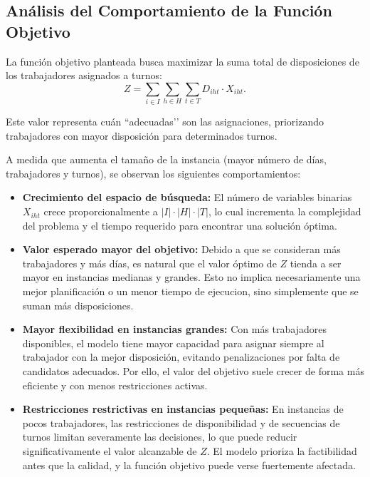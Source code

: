 \documentclass{article}
\begin{document}
\subsection*{Análisis del Comportamiento de la Función Objetivo}

La función objetivo planteada busca maximizar la suma total de disposiciones de los trabajadores asignados a turnos:
\[
Z = \sum_{i \in I} \sum_{h \in H} \sum_{t \in T} D_{iht} \cdot X_{iht}.
\]

Este valor representa cuán “adecuadas’’ son las asignaciones, priorizando trabajadores con mayor disposición para determinados turnos.

A medida que aumenta el tamaño de la instancia (mayor número de días, trabajadores y turnos), se observan los siguientes comportamientos:

\begin{itemize}
    \item \textbf{Crecimiento del espacio de búsqueda:} El número de variables binarias $X_{iht}$ crece proporcionalmente a $|I| \cdot |H| \cdot |T|$, lo cual incrementa la complejidad del problema y el tiempo requerido para encontrar una solución óptima.

    \item \textbf{Valor esperado mayor del objetivo:} Debido a que se consideran más trabajadores y más días, es natural que el valor óptimo de $Z$ tienda a ser mayor en instancias medianas y grandes. Esto no implica necesariamente una mejor planificación o un menor tiempo de ejecucion, sino simplemente que se suman más disposiciones.

    \item \textbf{Mayor flexibilidad en instancias grandes:}
    Con más trabajadores disponibles, el modelo tiene mayor capacidad para asignar siempre al trabajador con la mejor disposición, evitando penalizaciones por falta de candidatos adecuados. Por ello, el valor del objetivo suele crecer de forma más eficiente y con menos restricciones activas.

    \item \textbf{Restricciones restrictivas en instancias pequeñas:}
    En instancias de pocos trabajadores, las restricciones de disponibilidad y de secuencias de turnos limitan severamente las decisiones, lo que puede reducir significativamente el valor alcanzable de $Z$.  
    El modelo prioriza la factibilidad antes que la calidad, y la función objetivo puede verse fuertemente afectada.
\end{itemize}
\end{document}
